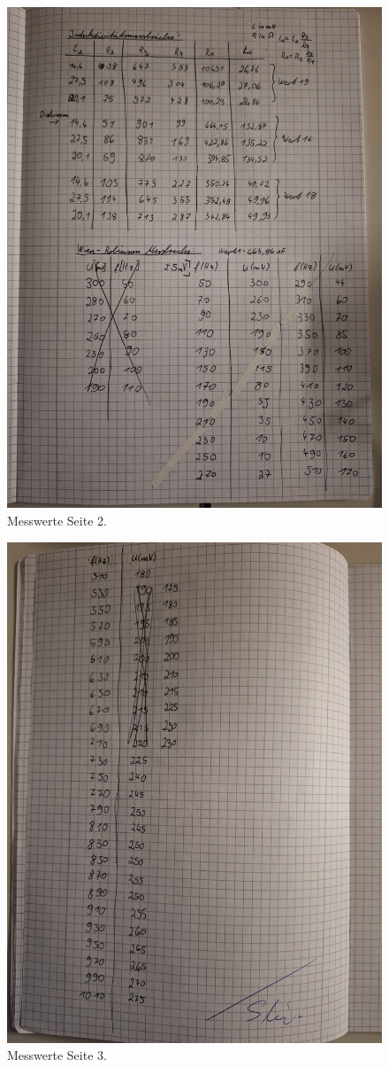 \begin{figure}
    \caption{Messwerte Seite 2.}
    \centering
    \includegraphics[width=\textwidth, angle=-90]{"Bilder/S2.jpg"}
\end{figure}

\begin{figure}
    \caption{Messwerte Seite 3.}
    \centering
    \includegraphics[width=\textwidth, angle=-90]{"Bilder/S3.jpg"}
\end{figure}